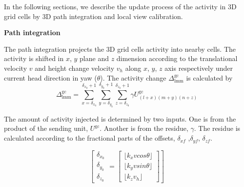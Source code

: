 In the following sections, we describe the update process of the activity in 3D grid cells by 3D path integration and local view calibration.


\textbf{Path integration}

The path integration projects the 3D grid cells activity into nearby cells. 
The activity is shifted in $x$, $y$ plane and $z$ dimension according to the translational velocity $v$ and height change velocity $v_h$ along $x$, $y$, $z$ axis respectively under current head direction in yaw ($\theta$). 
The activity change $ \Delta_{\text{lmm}}^{\text{gc}} $ is calculated by
%
\begin{equation}
	\Delta_{\text{lmm}}^{\text{gc}} = 
		\sum_{x=\delta_{x_0}}^{\delta_{x_0}+1}
		\sum_{y=\delta_{y_0}}^{\delta_{y_0}+1}
		\sum_{z=\delta_{z_0}}^{\delta_{z_0}+1}
		\gamma
		U_{(l+x)(m+y)(n+z)}^{\text{gc}}
\end{equation}

The amount of activity injected is determined by two inputs. 
One is from the product of the sending unit, $U^{\text{gc}}$. 
Another is from the residue, $\gamma$. 
The residue is calculated according to the fractional parts of the offsets, $\delta_{xf}$ ,$\delta_{yf}$, $\delta_{zf}$.

\begin{equation}
	\left[
		\begin{matrix}
			\delta_{x_0} \\
			\delta_{y_0} \\
			\delta_{z_0}
		\end{matrix}
	=
	\left[
		\begin{matrix}
			\lfloor k_x v cos\theta \rfloor \\
			\lfloor k_y v sin\theta \rfloor \\
			\lfloor k_z v_h \rfloor
		\end{matrix}
	\right]
	\right]
\end{equation}

